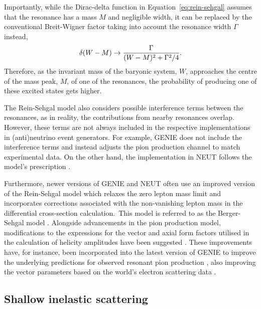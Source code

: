 Importantly, while the Dirac-delta function in Equation~\ref{eq:rein-sehgal} assumes that the resonance has a mass $M$ and negligible width, it can be replaced by the conventional Breit-Wigner factor taking into account the resonance width $\Gamma$ instead, 
\vspace{-10pt}
\begin{equation}
    \delta(W-M) \rightarrow \frac{\Gamma}{(W-M)^2 + \Gamma^2/4} \vspace{2pt}.
    \vspace{-10pt}
\end{equation}
Therefore, as the invariant mass of the baryonic system, $W$, approaches the centre of the mass peak, $M$, of one of the resonances, the probability of producing one of these excited states gets higher. 

The Rein-Sehgal model also considers possible interference terms between the resonances, as in reality, the contributions from nearby resonances overlap. However, these terms are not always included in the respective implementations in (anti)neutrino event generators. For example, GENIE does not include the interference terms and instead adjusts the pion production channel to match experimental data. On the other hand, the implementation in NEUT follows the model's prescription \cite{Boyd:2009zz}. 

Furthermore, newer versions of GENIE and NEUT often use an improved version of the Rein-Sehgal model which relaxes the zero lepton mass limit and incorporates corrections associated with the non-vanishing lepton mass in the differential cross-section calculation\cite{kuzmin, coherentMass_REIN2007207, Adler_2006,PhysRevD.76.113004}.~This model is referred to as the Berger-Sehgal model \cite{PhysRevD.76.113004}. Alongside advancements in the pion production model, modifications to the expressions for the vector and axial form factors utilised in the calculation of helicity amplitudes have been suggested \cite{PhysRevD.77.053001}. These improvements have, for instance, been incorporated into the latest version of GENIE \cite{genie3} to improve the underlying predictions for observed resonant pion production \cite{Nowak_2009}, also improving the vector parameters based on the world's electron scattering data \cite{PhysRevD.74.014009}.


\subsection{Shallow inelastic scattering}

